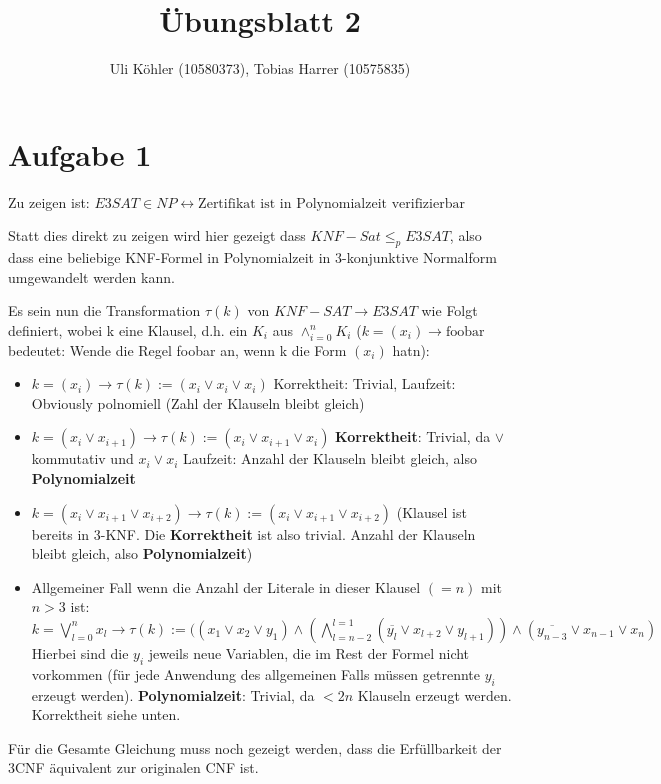 \documentclass[a4paper,10pt,oneside,leqno]{scrartcl}
\title{Übungsblatt 2}
\author{Uli Köhler (10580373), Tobias Harrer (10575835)}
\begin{document}
\maketitle
\section*{Aufgabe 1}%

Zu zeigen ist: $E3SAT \in {NP} \leftrightarrow \text{Zertifikat ist in Polynomialzeit verifizierbar}$

Statt dies direkt zu zeigen wird hier gezeigt dass $KNF-Sat \leq_p E3SAT$, also dass eine beliebige KNF-Formel in Polynomialzeit in 3-konjunktive Normalform umgewandelt werden kann.

Es sein nun die Transformation $\tau(k)$ von $KNF-SAT \rightarrow E3SAT$ wie Folgt definiert, wobei k eine Klausel, d.h. ein $K_i$ aus $\wedge_{i=0}^n K_i$ ($k = (x_i) \rightarrow \text{foobar}$ bedeutet: Wende die Regel foobar an, wenn k die Form $(x_i)$ hatn):
\begin{itemize}
 \item  $k = (x_i) \rightarrow \tau(k) := (x_i \vee x_i \vee x_i)$ Korrektheit: Trivial, Laufzeit: Obviously polnomiell (Zahl der Klauseln bleibt gleich)
 \item  $k = (x_i \vee x_{i+1}) \rightarrow \tau(k) :=  (x_i \vee x_{i+1} \vee x_i)$  \textbf{Korrektheit}: Trivial, da $\vee$ kommutativ und $x_i \vee x_i$ Laufzeit: Anzahl der Klauseln bleibt gleich, also \textbf{Polynomialzeit}
 \item $k = (x_i \vee x_{i+1} \vee x_{i+2}) \rightarrow \tau(k) := (x_i \vee x_{i+1} \vee x_{i+2})$ (Klausel ist bereits in 3-KNF. Die  \textbf{Korrektheit} ist also trivial. Anzahl der Klauseln bleibt gleich, also \textbf{Polynomialzeit})
 \item Allgemeiner Fall wenn die Anzahl der Literale in dieser Klausel $(=n)$ mit $n > 3$ ist: $k = \bigvee_{l=0}^{n} x_l \rightarrow \tau(k) := ( (x_1 \vee x_2 \vee y_1) \wedge (\bigwedge_{l=n-2}^{l=1} (\overline{y_l} \vee x_{l + 2} \vee y_{l+1})) \wedge (\overline{y_{n-3}} \vee x_{n-1} \vee x_{n})$ 
Hierbei sind die $y_i$ jeweils neue Variablen, die im Rest der Formel nicht vorkommen (für jede Anwendung des allgemeinen Falls müssen getrennte $y_i$ erzeugt werden). \textbf{Polynomialzeit}: Trivial, da $< 2n$ Klauseln erzeugt werden. Korrektheit siehe unten.
\end{itemize}

Für die Gesamte Gleichung muss noch gezeigt werden, dass die Erfüllbarkeit der 3CNF äquivalent zur originalen CNF ist.
\end{document}
